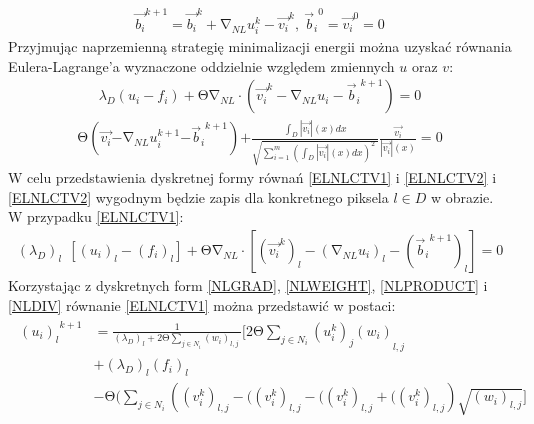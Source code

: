 \documentclass[12pt, twoside, openany]{report}
\theoremstyle{definition}
\begin{document}
\begin{align}
{\overrightarrow{b_i}}^{k+1}={\overrightarrow{b_i}}^k+{\mathrm{\nabla }}_{NL}u^k_i-{\overrightarrow{v_i}}^k,\ {{\overrightarrow{b}}_i}^0={\overrightarrow{v_i}}^0=0
\label{ENLCTV2}
\end{align}
Przyjmując naprzemienną strategię minimalizacji energii można uzyskać równania Eulera-Lagrange’a wyznaczone oddzielnie względem zmiennych $u$ oraz $v$:
\begin{align}
{\lambda }_D\left(u_i-f_i\right)+\mathrm{\Theta }{\mathrm{\nabla }}_{NL}\cdot \left({\overrightarrow{v_i}}^k-{\mathrm{\nabla }}_{NL}u_i-{{\overrightarrow{b}}_i}^{k+1}\right)=0
\label{ELNLCTV1}
\end{align}
\begin{align}
\mathrm{\Theta }\left(\overrightarrow{v_i}\mathrm{-}{\mathrm{\nabla }}_{NL}u^{k+1}_i\mathrm{-}{{\overrightarrow{b}}_i}^{k+1}\right)\mathrm{+}\frac{\int_D{\left|\overrightarrow{v_i}\right|(x)}dx}{\sqrt{\sum^m_{i=1}{{\left(\int_D{\left|\overrightarrow{v_i}\right|(x)}dx\right)}^2}\ }}\frac{\overrightarrow{v_i}}{\left|\overrightarrow{v_i}\right|(x)}\mathrm{=0}
\label{ELNLCTV2}
\end{align}
W celu przedstawienia dyskretnej formy równań \eqref{ELNLCTV1} i  \eqref{ELNLCTV2} i \eqref{ELNLCTV2} wygodnym będzie zapis dla konkretnego piksela $l\in D$ w obrazie. W przypadku \eqref{ELNLCTV1}: 
\begin{align}
{\left({\lambda }_D\right)}_l\ \ \left[{\left(u_i\right)}_l-{\left(f_i\right)}_l\right]+\mathrm{\Theta }{\mathrm{\nabla }}_{NL}\cdot \left[{\left({\overrightarrow{v_i}}^k\right)}_l-{\left({\mathrm{\nabla }}_{NL}u_i\right)}_l-{\left({{\overrightarrow{b}}_i}^{k+1}\right)}_l\right]=0
\label{DELNLCTV1}
\end{align}
Korzystając z dyskretnych form \eqref{NLGRAD}, \eqref{NLWEIGHT}, \eqref{NLPRODUCT} i \eqref{NLDIV} równanie \eqref{ELNLCTV1} można przedstawić w postaci:
\begin{align}
\begin{aligned}
{{\left(u_i\right)}_l}^{k+1} &= \frac{1}{{\left({\lambda }_D\right)}_l+2\mathrm{\Theta} \sum\limits_{j\in N_i} {\left(w_i\right)}_{l,j}\ } \Biggl[2\mathrm{\Theta }\sum_{j\in N_i} {{{\left(u^k_i\right)}_j\left(w_i\right)}_{l,j}\ }\\
&+ {\left({\lambda }_D\right)}_l{\left(f_i\right)}_l \\
&-\mathrm{\Theta} \Biggl( \sum_{j\in N_i} \left( \left({ v^k_i}\right)_{l,j} - (\left({ v^k_i}\right)_{l,j} - (\left({ v^k_i}\right)_{l,j} + (\left({ v^k_i}\right)_{l,j}\right) \sqrt{{\left(w_i\right)}_{l,j}} \Biggr]
\end{aligned}
\label{uNLCTV}
\end{align}
\end{document}
